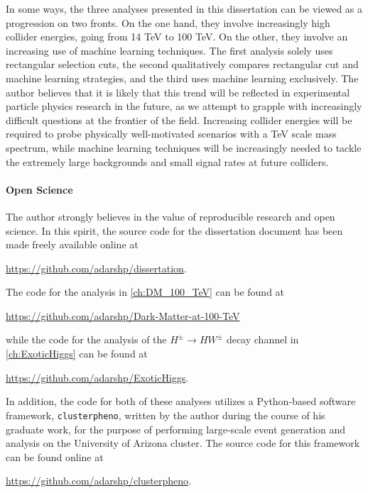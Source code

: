 In some ways, the three analyses presented in this dissertation can be viewed as a progression on two fronts. On the one hand, they involve increasingly high collider energies, going from 14 TeV to 100 TeV. On the other, they involve an increasing use of machine learning techniques. The first analysis solely uses rectangular selection cuts, the second qualitatively compares rectangular cut and machine learning strategies, and the third uses machine learning exclusively. The author believes that it is likely that this trend will be reflected in experimental particle physics research in the future, as we attempt to grapple with increasingly difficult questions at the frontier of the field. Increasing collider energies will be required to probe physically well-motivated scenarios with a TeV scale mass spectrum, while machine learning techniques will be increasingly needed to tackle the extremely large backgrounds and small signal rates at future colliders.

\paragraph{Open Science} The author strongly believes in the value of reproducible research and open science. In this spirit, the source code for the dissertation document has been made freely available online at

\url{https://github.com/adarshp/dissertation}.

\noindent The code for the analysis in \autoref{ch:DM_100_TeV} can be found at

\url{https://github.com/adarshp/Dark-Matter-at-100-TeV}

\noindent while the code for the analysis of the $H^\pm\rightarrow HW^\pm$ decay channel in \autoref{ch:ExoticHiggs} can be found at

\url{https://github.com/adarshp/ExoticHiggs}.

\noindent In addition, the code for both of these analyses utilizes a Python-based software framework, \texttt{clusterpheno}, written by the author during the course of his graduate work, for the purpose of performing large-scale event generation and analysis on the University of Arizona cluster. The source code for this framework can be found online at 

\url{https://github.com/adarshp/clusterpheno}.

